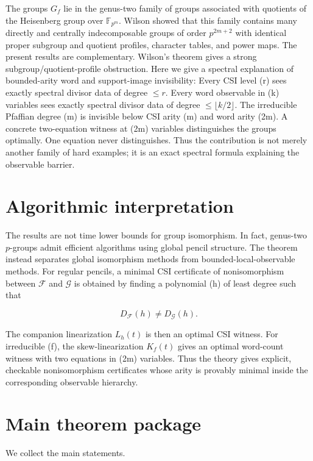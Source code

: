 \documentclass[11pt]{article}
\begin{document}
The groups $G_f$ lie in the genus-two family of groups associated with quotients of the Heisenberg group over $\mathbb F_{p^m}$. Wilson showed that this family contains many directly and centrally indecomposable groups of order $p^{2m+2}$ with identical proper subgroup and quotient profiles, character tables, and power maps. The present results are complementary. Wilson's theorem gives a strong subgroup/quotient-profile obstruction. Here we give a spectral explanation of bounded-arity word and support-image invisibility: Every CSI level (r) sees exactly spectral divisor data of degree $\le r$. Every word observable in (k) variables sees exactly spectral divisor data of degree $\le\lfloor k/2\rfloor$. The irreducible Pfaffian degree (m) is invisible below CSI arity (m) and word arity (2m). A concrete two-equation witness at (2m) variables distinguishes the groups optimally. One equation never distinguishes. Thus the contribution is not merely another family of hard examples; it is an exact spectral formula explaining the observable barrier.

\section{Algorithmic interpretation}

The results are not time lower bounds for group isomorphism. In fact, genus-two $p$-groups admit efficient algorithms using global pencil structure. The theorem instead separates global isomorphism methods from bounded-local-observable methods. For regular pencils, a minimal CSI certificate of nonisomorphism between $\mathcal F$ and $\mathcal G$ is obtained by finding a polynomial (h) of least degree such that

\[
D_{\mathcal F}(h)\ne D_{\mathcal G}(h).
\]

The companion linearization $L_h(t)$ is then an optimal CSI witness. For irreducible (f), the skew-linearization $K_f(t)$ gives an optimal word-count witness with two equations in (2m) variables. Thus the theory gives explicit, checkable nonisomorphism certificates whose arity is provably minimal inside the corresponding observable hierarchy.

\section{Main theorem package}

We collect the main statements.
\end{document}
